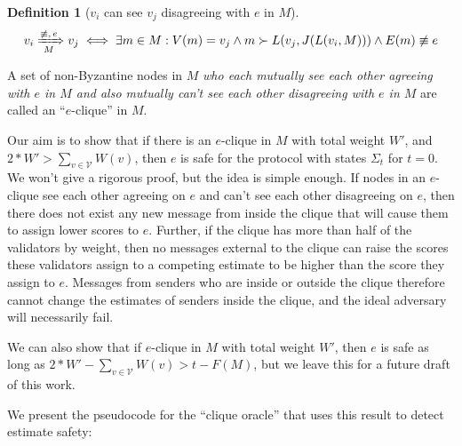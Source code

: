 \documentclass{article}
\theoremstyle{definition}
\newtheorem{defn}{Definition}[section]
\begin{document}
\begin{defn}[$v_i$ can see $v_j$ disagreeing with $e$ in $M$]
$$
v_i \xRightarrow[\text{$M$}]{\text{$\not\equiv, e$}} v_j \iff \exists m \in M : V(m) = v_j \land m \succ L(v_j, J(L(v_i, M))) \land E(m) \not\equiv e
$$
\end{defn}

A set of non-Byzantine nodes in $M$ \emph{who each mutually see each other agreeing with $e$ in $M$ and also mutually can't see each other disagreeing with $e$ in $M$} are called an ``$e$-clique'' in $M$.

Our aim is to show that if there is an $e$-clique in $M$ with total weight $W'$, and $2*W' > \sum_{v\in \mathcal{V}} W(v)$, then $e$ is safe for the protocol with states $\Sigma_t$ for $t = 0$. We won't give a rigorous proof, but the idea is simple enough. If nodes in an $e$-clique see each other agreeing on $e$ and can't see each other disagreeing on $e$, then there does not exist any new message from inside the clique that will cause them to assign lower scores to $e$. Further, if the clique has more than half of the validators by weight, then no messages external to the clique can raise the scores these validators assign to a competing estimate to be higher than the score they assign to $e$. Messages from senders who are inside or outside the clique therefore cannot change the estimates of senders inside the clique, and the ideal adversary will necessarily fail.

We can also show that if $e$-clique in $M$ with total weight $W'$, then $e$ is safe as long as $2*W' - \sum_{v\in \mathcal{V}} W(v) > t - F(M)$, but we leave this for a future draft of this work.

We present the pseudocode for the ``clique oracle'' that uses this result to detect estimate safety:
\end{document}
